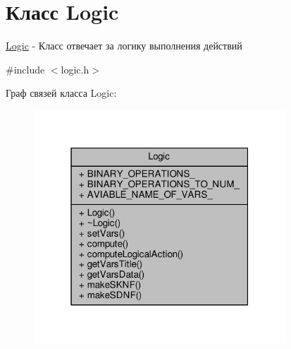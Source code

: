 \hypertarget{class_logic}{}\section{Класс Logic}
\label{class_logic}


\hyperlink{class_logic}{Logic} -\/ Класс отвечает за логику выполнения действий  




{\ttfamily \#include $<$logic.\+h$>$}



Граф связей класса Logic\+:\nopagebreak
\begin{figure}[H]
\begin{center}
\leavevmode
\includegraphics[width=268pt]{class_logic__coll__graph}
\end{center}
\end{figure}
